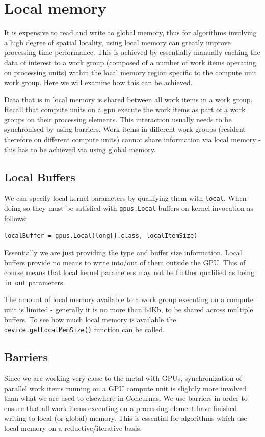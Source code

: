 \documentclass[conc-doc]{subfiles}
\begin{document}
\section{Local memory}
It is expensive to read and write to global memory, thus for algorithms involving a  high degree of spatial locality, using local memory can greatly improve processing time performance. This is achieved by essentially manually caching the data of interest to a work group (composed of a number of work items operating on processing units) within the local memory region specific to the compute unit work group. Here we will examine how this can be achieved.

Data that is in local memory is shared between all work items in a work group. Recall that compute units on a gpu execute the work items as part of a work groups on their processing elements. This interaction usually needs to be synchronised by using barriers. Work items in different work groups (resident therefore on different compute units) cannot share information via local memory - this has to be achieved via using global memory.

\subsection{Local Buffers}
We can specify local kernel parameters by qualifying them with \lstinline{local}. When doing so they must be satisfied with \lstinline{gpus.Local} buffers on kernel invocation as follows:
\begin{center}
	\lstinline{localBuffer = gpus.Local(long[].class, localItemSize)}
\end{center}

Essentially we are just providing the type and buffer size information. Local buffers provide no means to write into/out of them outside the GPU. This of course means that local kernel parameters may not be further qualified as being \lstinline{in out} parameters.

The amount of local memory available to a work group executing on a compute unit is limited - generally it is no more than 64Kb, to be shared across multiple buffers. To see how much local memory is available the \lstinline{device.getLocalMemSize()} function can be called.

\subsection{Barriers}
Since we are working very close to the metal with GPUs, synchronization of parallel work items running on a GPU compute unit is slightly more involved than what we are used to elsewhere in Concurnas. We use barriers in order to ensure that all work items executing on a processing element have finished writing to local (or global) memory. This is essential for algorithms which use local memory on a reductive/iterative basis.
\end{document}
